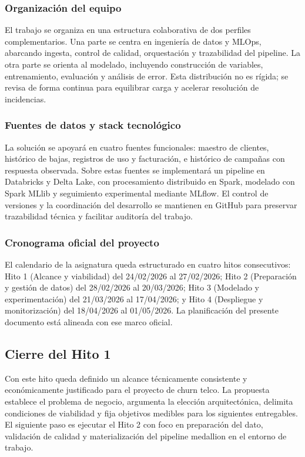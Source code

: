 \documentclass[12pt,a4paper]{article}
\begin{document}
\subsubsection{Organización del equipo}

El trabajo se organiza en una estructura colaborativa de dos perfiles complementarios. Una parte se centra en ingeniería de datos y MLOps, abarcando ingesta, control de calidad, orquestación y trazabilidad del pipeline. La otra parte se orienta al modelado, incluyendo construcción de variables, entrenamiento, evaluación y análisis de error. Esta distribución no es rígida; se revisa de forma continua para equilibrar carga y acelerar resolución de incidencias.

\subsubsection{Fuentes de datos y stack tecnológico}

La solución se apoyará en cuatro fuentes funcionales: maestro de clientes, histórico de bajas, registros de uso y facturación, e histórico de campañas con respuesta observada. Sobre estas fuentes se implementará un pipeline en Databricks y Delta Lake, con procesamiento distribuido en Spark, modelado con Spark MLlib y seguimiento experimental mediante MLflow. El control de versiones y la coordinación del desarrollo se mantienen en GitHub para preservar trazabilidad técnica y facilitar auditoría del trabajo.

\subsubsection{Cronograma oficial del proyecto}

El calendario de la asignatura queda estructurado en cuatro hitos consecutivos: Hito 1 (Alcance y viabilidad) del 24/02/2026 al 27/02/2026; Hito 2 (Preparación y gestión de datos) del 28/02/2026 al 20/03/2026; Hito 3 (Modelado y experimentación) del 21/03/2026 al 17/04/2026; y Hito 4 (Despliegue y monitorización) del 18/04/2026 al 01/05/2026. La planificación del presente documento está alineada con ese marco oficial.

\subsection{Cierre del Hito 1}

Con este hito queda definido un alcance técnicamente consistente y económicamente justificado para el proyecto de churn telco. La propuesta establece el problema de negocio, argumenta la elección arquitectónica, delimita condiciones de viabilidad y fija objetivos medibles para los siguientes entregables. El siguiente paso es ejecutar el Hito 2 con foco en preparación del dato, validación de calidad y materialización del pipeline medallion en el entorno de trabajo.
\end{document}
